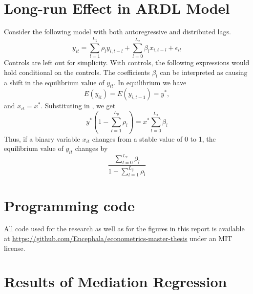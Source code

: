 \chapter{Long-run Effect in ARDL Model}
\label{chap:app:long_run_effect}
Consider the following model with both autoregressive and distributed lags.
\begin{equation}
    \label{eq:app:ardl_model}
    y_{it} = \sum_{l=1}^{L_y} \rho_l y_{i,t-l} + \sum_{l=0}^{L_x} \beta_l x_{i,t-l} + \epsilon_{it}
\end{equation}
Controls are left out for simplicity. With controls, the following expressions would hold conditional on the
controls.
The coefficients $\beta_l$ can be interpreted as causing a shift in the equilibrium value of $y_{it}$.
In equilibrium we have
\begin{equation}
    E(y_{it}) = E(y_{i,t-1}) = y^*,
\end{equation}
and $x_{it} = x^*$. Substituting in , we get
\begin{equation}
    y^* (1 - \sum_{l=1}^{L_y} \rho_l) = x^* \sum_{l=0}^{L_x} \beta_l
\end{equation}
Thus, if a binary variable $x_{it}$ changes from a stable value of  0 to 1, the equilibrium value of $y_{it}$ changes by
\begin{equation}
    \frac{\sum_{l=0}^{L_x} \beta_l}{1 - \sum_{l=1}^{L_y} \rho_l}
\end{equation}

\chapter{Programming code}
\label{chap:app:code}
All code used for the research as well as for the figures in this report is available at
\url{https://github.com/Encephala/econometrics-master-thesis} under an MIT license.

\chapter{Results of Mediation Regression}
\label{chap:app:mediation_regression}

